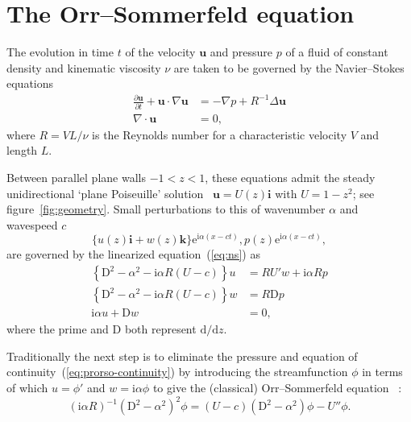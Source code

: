 \documentclass[twocolum]{afmc_art}
\begin{document}
\section{The Orr--Sommerfeld equation}\nopagebreak
The evolution in  time $t$ of the  velocity $\mathbf u$ and pressure $p$ of a fluid of constant density and kinematic viscosity $\nu$ are taken to be governed by the Navier--Stokes equations
\begin{subequations}\label{eq:ns}
  \begin{align}
    \frac{\partial\mathbf u}{\partial t} + \mathbf u\cdot\nabla\mathbf u
    & = -\nabla p + R^{-1} \Delta \mathbf u \\
    \nabla\cdot\mathbf u & = 0,\label{eq:ns-continuity}
  \end{align}
\end{subequations}
where $R = VL/\nu$ is the Reynolds number for a characteristic velocity $V$ and length $L$.

Between parallel plane walls $-1 < z < 1$, these
equations admit the steady unidirectional `plane Poiseuille' solution~\cite[eq.\ 25.3]{drazin2004hydrodynamic} $\mathbf u = U (z)\mathbf i$ with $ U = 1 - z^2$; see figure~\ref{fig:geometry}.  Small perturbations to this of wavenumber $\alpha$ and wavespeed $c$~\cite[eq.\ 21.1]{drazin2004hydrodynamic}
\begin{equation}
  \{u(z)\mathbf i + w(z)\mathbf k\} \mathrm e^{\mathrm i\alpha (x - ct)}, p (z) \mathrm e^{\mathrm i\alpha (x - ct)},
\end{equation}
are governed by the linearized equation~(\ref{eq:ns}) as
\begin{subequations}\label{eq:prorso}
  \begin{align}
    \label{eq:prorso-u}
  \left\{\mathrm D^2 - \alpha^2 - \mathrm i\alpha R (U - c)\right\} u
  &= R U' w + \mathrm i\alpha R p \\
  \left\{\mathrm D^2 - \alpha^2 - \mathrm i \alpha R (U - c)\right\} w
  &= R \mathrm D p  \label{eq:prorso-w} \\
  \mathrm i\alpha u + \mathrm D w &= 0, \label{eq:prorso-continuity}
  \end{align}
\end{subequations}
where the prime and $\mathrm D$ both represent $\mathrm d/\mathrm dz$.

Traditionally the next step is to eliminate the pressure and equation of continuity~(\ref{eq:prorso-continuity}) by introducing the streamfunction $\phi$ in terms of which $u=\phi'$ and $w=\mathrm i\alpha\phi$ to give the (classical) Orr--Sommerfeld equation~\cite[eq.\ 25.12]{drazin2004hydrodynamic} :
\begin{equation}\label{eq:os}
  (\mathrm i\alpha R)^{-1} \left(\mathrm D^2 - \alpha^2\right)^2 \phi
  = (U - c)\left(\mathrm D^2 - \alpha^2\right)\phi - U''\phi.
\end{equation}
\end{document}
